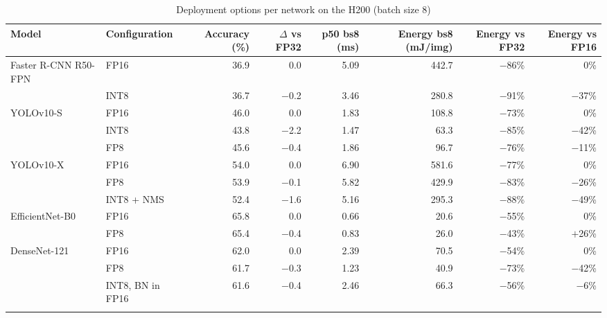 \begin{table}
\footnotesize\setlength{\tabcolsep}{4pt}
\caption{Deployment options per network on the H200 (batch size 8)}\label{tab:deployment}
\begin{tabular}{@{}llrrrrrr@{}}
\toprule
Model & Configuration & Accuracy (\%) & $\Delta$ vs FP32 & p50 bs8 (ms) & Energy bs8 (mJ/img) & Energy vs FP32 & Energy vs FP16 \\
\midrule
Faster R-CNN R50-FPN & FP16 & 36.9 & 0.0 & 5.09 & 442.7 & $-$86\% & 0\% \\
 & INT8 & 36.7 & $-$0.2 & 3.46 & 280.8 & $-$91\% & $-$37\% \\
\midrule
YOLOv10-S & FP16 & 46.0 & 0.0 & 1.83 & 108.8 & $-$73\% & 0\% \\
 & INT8 & 43.8 & $-$2.2 & 1.47 & 63.3 & $-$85\% & $-$42\% \\
 & FP8 & 45.6 & $-$0.4 & 1.86 & 96.7 & $-$76\% & $-$11\% \\
\midrule
YOLOv10-X & FP16 & 54.0 & 0.0 & 6.90 & 581.6 & $-$77\% & 0\% \\
 & FP8 & 53.9 & $-$0.1 & 5.82 & 429.9 & $-$83\% & $-$26\% \\
 & INT8 + NMS & 52.4 & $-$1.6 & 5.16 & 295.3 & $-$88\% & $-$49\% \\
\midrule
EfficientNet-B0 & FP16 & 65.8 & 0.0 & 0.66 & 20.6 & $-$55\% & 0\% \\
 & FP8 & 65.4 & $-$0.4 & 0.83 & 26.0 & $-$43\% & $+$26\% \\
\midrule
DenseNet-121 & FP16 & 62.0 & 0.0 & 2.39 & 70.5 & $-$54\% & 0\% \\
 & FP8 & 61.7 & $-$0.3 & 1.23 & 40.9 & $-$73\% & $-$42\% \\
 & INT8, BN in FP16 & 61.6 & $-$0.4 & 2.46 & 66.3 & $-$56\% & $-$6\% \\
\botrule
\end{tabular}
\end{table}
